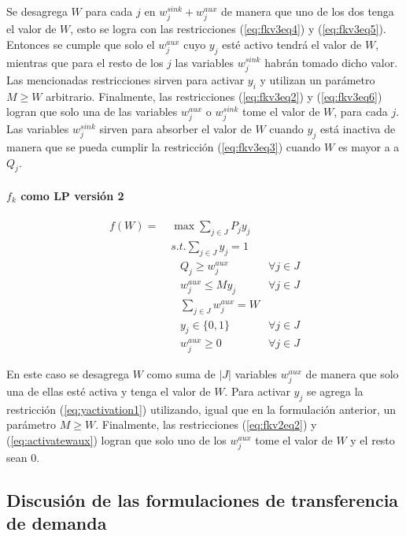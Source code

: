 Se desagrega $W$ para cada $j$ en $w^{sink}_j + w^{aux}_j$ de manera que uno de los dos tenga el valor de $W$, esto se logra con las restricciones (\ref{eq:fkv3eq4}) y (\ref{eq:fkv3eq5}). Entonces se cumple que solo el $w^{aux}_j$ cuyo $y_j$ esté activo tendrá el valor de $W$, mientras que para el resto de los $j$ las variables $w^{sink}_j$ habrán tomado dicho valor. Las mencionadas restricciones sirven para activar $y_i$ y utilizan un parámetro $M \geq W$ arbitrario. Finalmente, las restricciones (\ref{eq:fkv3eq2}) y (\ref{eq:fkv3eq6}) logran que solo una de las variables $w^{aux}_j$ o $w^{sink}_j$ tome el valor de $W$, para cada $j$. Las variables $w^{sink}_j$ sirven para absorber el valor de $W$ cuando $y_j$ está inactiva de manera que se pueda cumplir la restricción (\ref{eq:fkv3eq3}) cuando $W$ es mayor a a $Q_j$.

\paragraph*{$f_k$ como LP versión 2}

\begin{align}
  f(W) =\; & \max \sum_{j \in J} P_j y_j             & \label{eq:fkv2eq1}\\
           & s.t. \sum_{j \in J} y_j = 1            & \label{eq:fkv2eq2}\\
           & \;\;\; Q_j \geq w^{aux}_j              & \forall j \in J \label{eq:implfkoriginalineq} \\
           & \;\;\; w^{aux}_j \leq M y_j            & \forall j \in J \label{eq:yactivation1} \\
           & \;\;\; \sum_{j \in J} w^{aux}_j = W    & \label{eq:activatewaux} \\
           & \;\;\; y_j \in \{0,1\}                 & \label{eq:fkv2domainy} \forall j \in J\\
           & \;\;\; w^{aux}_j \geq 0                & \label{eq:fkv2eq6} \forall j \in J
\end{align}

En este caso se desagrega $W$ como suma de $|J|$ variables $w^{aux}_j$ de manera que solo una de ellas esté activa y tenga el valor de $W$. Para activar $y_j$ se agrega la restricción (\ref{eq:yactivation1}) utilizando, igual que en la formulación anterior, un parámetro $M \geq W$. Finalmente, las restricciones (\ref{eq:fkv2eq2}) y (\ref{eq:activatewaux}) logran que solo uno de los $w^{aux}_j$ tome el valor de $W$ y el resto sean 0.

\subsection{Discusión de las formulaciones de transferencia de demanda}

